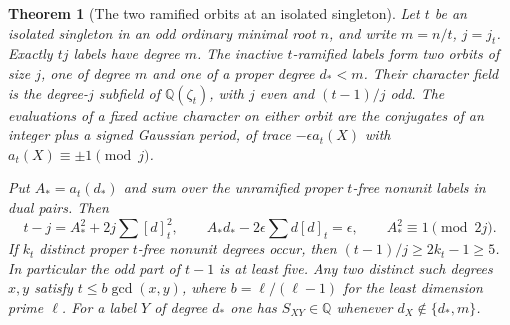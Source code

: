 \documentclass[11pt,a4paper]{article}
\numberwithin{equation}{section}
\newtheorem{theorem}{Theorem}[section]
\theoremstyle{remark}
\begin{document}
\begin{theorem}[The two ramified orbits at an isolated singleton]\label{fam:M:9.2}\label{nov:bruhat}\label{nov:three-deficit}\label{fourm:twoorbits}\label{main:full-multiplicity}
Let $t$ be an isolated singleton in an odd ordinary minimal root $n$,
and write $m=n/t$, $j=j_t$. Exactly $tj$ labels have degree $m$.
The inactive $t$-ramified labels form two orbits of size $j$, one of
degree $m$ and one of a proper degree $d_*<m$. Their character field
is the degree-$j$ subfield of $\mathbb Q(\zeta_t)$, with $j$ even
and $(t-1)/j$ odd. The evaluations of a fixed active character on
either orbit are the conjugates of an integer plus a signed Gaussian
period, of trace $-\epsilon a_t(X)$ with $a_t(X)\equiv\pm1\pmod j$.

Put $A_*=a_t(d_*)$ and sum over the unramified proper $t$-free
nonunit labels in dual pairs. Then
\[
 t-j=A_*^2+2j\sum[d]_t^2,\qquad A_*d_*-2\epsilon\sum d[d]_t=\epsilon,
 \qquad A_*^2\equiv1\pmod{2j}.
\]
If $k_t$ distinct proper $t$-free nonunit degrees occur, then
$(t-1)/j\ge2k_t-1\ge5$. In particular the odd part of $t-1$ is at
least five. Any two distinct such degrees $x,y$ satisfy
$t\le b\gcd(x,y)$, where $b=\ell/(\ell-1)$ for the least dimension
prime $\ell$. For a label $Y$ of degree $d_*$ one has
$S_{XY}\in\mathbb Q$ whenever $d_X\notin\{d_*,m\}$.
\end{theorem}
\end{document}
